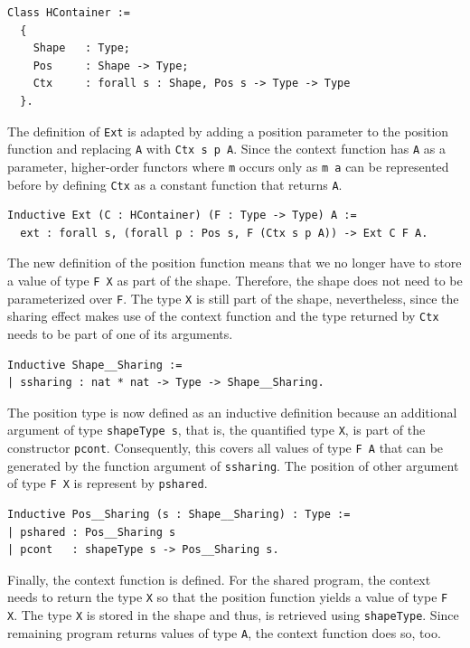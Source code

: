 \documentclass[a4paper, 11pt, fleqn, twoside]{scrreprt}
\newcommand{\hinl}[1]{\texttt{#1}}
\newcommand{\cinl}[1]{\texttt{#1}}
\begin{document}
\begin{verbatim}
Class HContainer :=
  {
    Shape   : Type;
    Pos     : Shape -> Type;
    Ctx     : forall s : Shape, Pos s -> Type -> Type
  }.
\end{verbatim}

The definition of \cinl{Ext} is adapted by adding a position parameter to the position function and replacing \cinl{A} with \cinl{Ctx s p A}.
Since the context function has \cinl{A} as a parameter, higher-order functors where \hinl{m} occurs only as \hinl{m a} can be represented before by defining \cinl{Ctx} as a constant function that returns \cinl{A}.
 
\begin{verbatim}
Inductive Ext (C : HContainer) (F : Type -> Type) A :=
  ext : forall s, (forall p : Pos s, F (Ctx s p A)) -> Ext C F A.
\end{verbatim}

The new definition of the position function means that we no longer have to store a value of type \cinl{F X} as part of the shape.
Therefore, the shape does not need to be parameterized over \cinl{F}.
The type \cinl{X} is still part of the shape, nevertheless, since the sharing effect makes use of the context function and the type returned by \cinl{Ctx} needs to be part of one of its arguments.

\begin{verbatim}
Inductive Shape__Sharing :=
| ssharing : nat * nat -> Type -> Shape__Sharing.
\end{verbatim}

The position type is now defined as an inductive definition because an additional argument of type \cinl{shapeType s}, that is, the quantified type \cinl{X}, is part of the constructor \cinl{pcont}.
Consequently, this covers all values of type \cinl{F A} that can be generated by the function argument of \cinl{ssharing}.
The position of other argument of type \cinl{F X} is represent by \cinl{pshared}.

\begin{verbatim}
Inductive Pos__Sharing (s : Shape__Sharing) : Type :=
| pshared : Pos__Sharing s
| pcont   : shapeType s -> Pos__Sharing s.
\end{verbatim}

Finally, the context function is defined.
For the shared program, the context needs to return the type \cinl{X} so that the position function yields a value of type \cinl{F X}.
The type \cinl{X} is stored in the shape and thus, is retrieved using \cinl{shapeType}.
Since remaining program returns values of type \cinl{A}, the context function does so, too.
\end{document}
